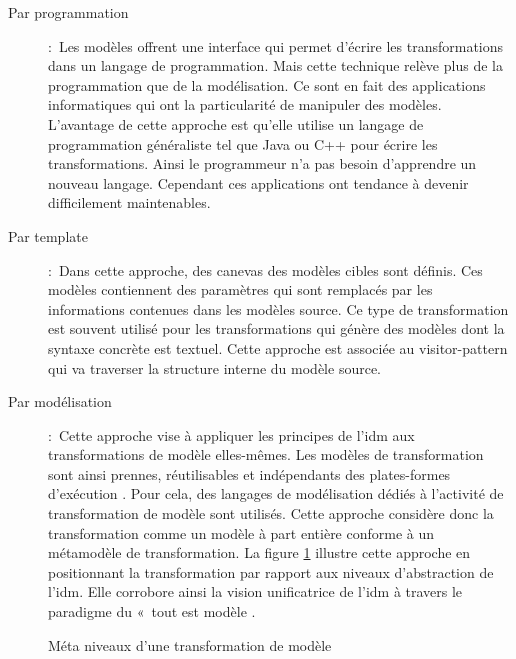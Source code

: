 \begin{description}

\item[Par programmation]:~Les modèles offrent une interface qui permet d'écrire les transformations dans 
un langage de programmation. Mais cette technique relève plus de la 
programmation que de la modélisation. Ce sont en fait des applications 
informatiques qui ont la particularité de manipuler des modèles. L'avantage de 
cette approche est qu'elle utilise un langage de programmation généraliste tel 
que Java ou C++ pour écrire les transformations. Ainsi le programmeur n'a pas 
besoin d'apprendre un nouveau langage. Cependant ces applications ont tendance à 
devenir difficilement maintenables.

\item [Par template]:~Dans cette approche, des canevas des modèles cibles sont définis. Ces modèles contiennent des paramètres qui sont remplacés par les informations contenues 
dans les modèles source. Ce type de transformation est souvent utilisé pour les 
transformations qui génère des modèles dont la syntaxe concrète  est textuel.  Cette approche est associée au visitor-pattern qui va traverser la structure interne du modèle source. 

\item [Par modélisation]:~Cette approche vise à appliquer les principes de l'\gls{idm} aux transformations de modèle elles-mêmes. Les modèles de transformation sont ainsi prennes, réutilisables et indépendants des plates-formes d'exécution  \cite{bezivin2006model}. Pour cela, des langages de modélisation dédiés à l'activité de transformation de modèle sont utilisés. Cette approche considère donc la transformation comme 
un modèle à part entière conforme à un métamodèle de transformation. La figure 
\ref{fig:TransfoPrincipe} illustre cette approche en positionnant la transformation par rapport aux niveaux d'abstraction de l'\gls{idm}. Elle corrobore 
ainsi la vision unificatrice de l'\gls{idm} à travers le paradigme du «~tout est 
modèle \cite{bezivin2005unification}.
\end{description}


\begin{figure}[!ht]
 \begin{center}
  
 \end{center}
 \caption{Méta niveaux d'une transformation de modèle}
 \label{fig:TransfoPrincipe}
\end{figure}


